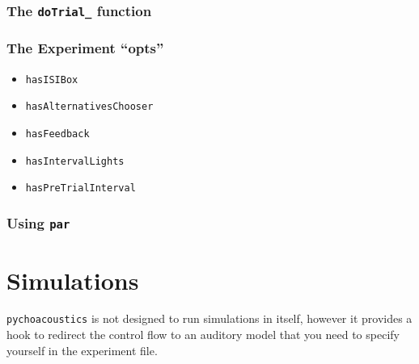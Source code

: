 \subsubsection{The \texttt{doTrial\_} function}

\subsubsection{The Experiment ``opts''}
\label{sec:experiment_opts}

\begin{itemize}
\item \verb+hasISIBox+
\item \verb+hasAlternativesChooser+
\item \verb+hasFeedback+
\item \verb+hasIntervalLights+
\item \verb+hasPreTrialInterval+
\end{itemize}

\subsubsection{Using \texttt{par}}
\label{sec:par}



\section{Simulations}
\label{sec:simulations}

\texttt{pychoacoustics} is not designed to run simulations in itself, however it provides a hook
to redirect the control flow to an auditory model that you need to specify yourself in the experiment file.


